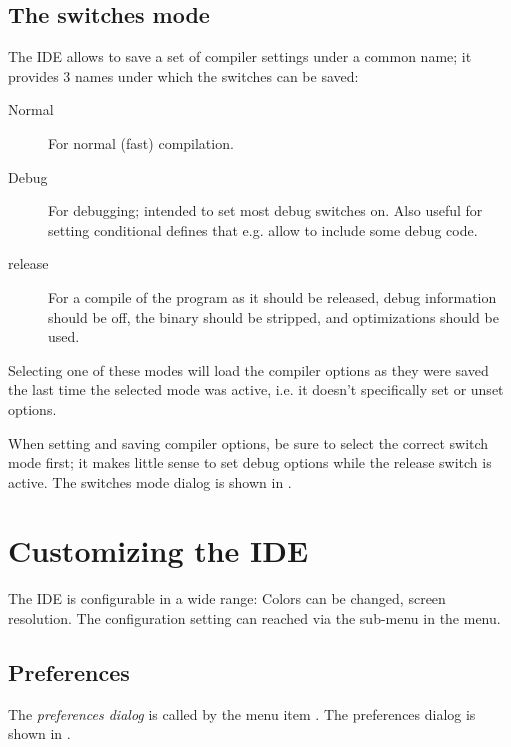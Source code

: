 \subsection{The switches mode}
\label{se:compilermode}
The IDE allows to save a set of compiler settings under a common name; it
provides 3 names under which the switches can be saved:
\begin{description}
\item[Normal] For normal (fast) compilation.
\item[Debug] For debugging; intended to set most debug switches on. Also
useful for setting conditional defines that e.g. allow to include some
debug code.
\item[release] For a compile of the program as it should be released, debug
information should be off, the binary should be stripped, and optimizations
should be used.
\end{description}
Selecting one of these modes will load the compiler options as they were
saved the last time the selected mode was active, i.e. it doesn't
specifically set or unset options.

When setting and saving compiler options, be sure to select the correct
switch mode first; it makes little sense to set debug options while the
release switch is active.
The switches mode dialog is shown in .


\section{Customizing the IDE}
The IDE is configurable in a wide range: Colors can be changed, screen
resolution. The configuration setting can reached via the
sub-menu  in the  menu.
%
%
\subsection{Preferences}
The {\em preferences dialog} is called by the menu item
.
The preferences dialog is shown in .


